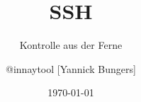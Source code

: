 \documentclass{beamer}
\title{SSH}
\subtitle{Kontrolle aus der Ferne}
\author{@innaytool [Yannick Bungers]}
\institute{FOSS AG}
\date{\today}
\begin{document}
\begin{frame}
\titlepage
\end{frame}




%










\end{document}
